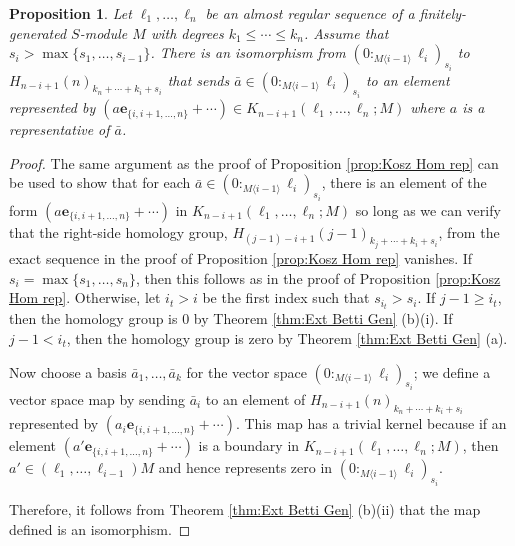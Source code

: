 \documentclass[a4paper, 10pt, reqno, english, ones]{amsart}  %
\newtheorem{proposition}[theorem]{Proposition}
\theoremstyle{definition}
\theoremstyle{remark}
\begin{document}
\begin{proposition}\label{prop:Kosz Hom iso}
Let $\ell_1,\dots, \ell_n$ be an almost regular sequence of a finitely-generated $S$-module $M$ with degrees $k_1\leq \cdots\leq k_n$. Assume that $s_i > \max\{ s_{1},\dots,s_{i-1}\}$. There is an isomorphism from $(0:_{M\langle i-1\rangle} \ell_{i})_{s_i}$ to  $H_{n-i+1}(n)_{k_n+\cdots+k_i+s_i}$ that sends $\bar{a}\in(0:_{M\langle i-1\rangle} \ell_{i})_{s_i}$ to an element represented by $(a\mathbf{e}_{\{i,i+1,\dots,n \}}+\cdots)\in K_{n-i+1}(\ell_1,\dots,\ell_n;M)$ where $a$ is a representative of $\bar{a}$.
\end{proposition}
\begin{proof}
    The same argument as the proof of Proposition \ref{prop:Kosz Hom rep} can be used to show that for each $\bar{a}\in (0:_{M\langle i-1\rangle} \ell_{i})_{s_i}$, there is an element of the form $(a\mathbf{e}_{\{i,i+1,\dots,n \}}+\cdots)$ in $K_{n-i+1}(\ell_1,\dots,\ell_n;M)$ so long as we can verify that the right-side homology group, $H_{(j-1)-i+1}(j-1)_{k_j+\cdots+k_i+s_i}$, from the exact sequence in the proof of Proposition \ref{prop:Kosz Hom rep} vanishes. If $s_i=\max\{s_1,\dots,s_n \}$, then this follows as in the proof of Proposition \ref{prop:Kosz Hom rep}. Otherwise, let $i_t>i$ be the first index such that $s_{i_t}>s_i$. If $j-1\geq i_t$, then the homology group is $0$ by Theorem \ref{thm:Ext Betti Gen} (b)(i). If $j-1 < i_t$, then the homology group is zero by Theorem \ref{thm:Ext Betti Gen} (a).

    Now choose a basis $\bar{a}_1,\dots,\bar{a}_k$ for the vector space $(0:_{M\langle i-1\rangle} \ell_{i})_{s_i}$; we define a vector space map by sending $\bar{a}_i$ to an element of $H_{n-i+1}(n)_{k_n+\cdots+k_i+s_i}$ represented by $(a_i\mathbf{e}_{\{i,i+1,\dots,n \}}+\cdots)$. This map has a trivial kernel because if an element $(a'\mathbf{e}_{\{i,i+1,\dots,n \}}+\cdots)$ is a boundary in $K_{n-i+1}(\ell_1,\dots,\ell_n;M)$, then $a'\in (\ell_1,\dots,\ell_{i-1})M$ and hence represents zero in $(0:_{M\langle i-1\rangle} \ell_{i})_{s_i}$.

    Therefore, it follows from Theorem \ref{thm:Ext Betti Gen} (b)(ii) that the map defined is an isomorphism.
\end{proof}
\end{document}
